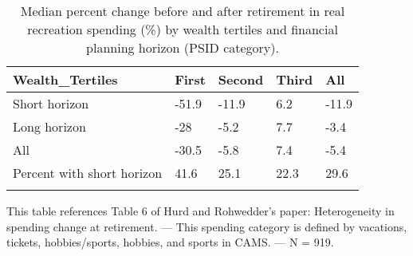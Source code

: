 \begin{table}[tbp] \centering
{}

\caption{Median percent change before and after retirement in real recreation spending (\%) by wealth tertiles and financial planning horizon (PSID category).}
\begin{tabularx}{\textwidth}{lCCCC}

\toprule
{Wealth\_Tertiles}&{First}&{Second}&{Third}&{All} \tabularnewline
\midrule\addlinespace[1.5ex]
Short horizon&-51.9&-11.9&6.2&-11.9 \tabularnewline
Long horizon&-28&-5.2&7.7&-3.4 \tabularnewline
All&-30.5&-5.8&7.4&-5.4 \tabularnewline
Percent with short horizon&41.6&25.1&22.3&29.6 \tabularnewline
\bottomrule \addlinespace[1.5ex]

\end{tabularx}
\begin{flushleft}
\footnotesize This table references Table 6 of Hurd and Rohwedder's paper: Heterogeneity in spending change at retirement. \linebreak --- \linebreak This spending category is defined by vacations, tickets, hobbies/sports, hobbies, and sports in CAMS. \linebreak --- \linebreak N = 919.
\end{flushleft}
\end{table}

